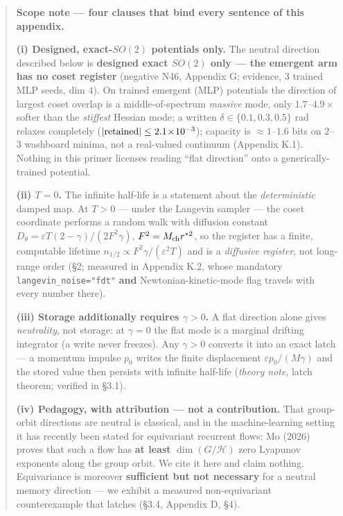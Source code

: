 \documentclass[10pt]{article}
\begin{document}
\begin{quote}\small
\textbf{Scope note --- four clauses that bind every sentence of this appendix.}

\textbf{(i) Designed, exact-$SO(2)$ potentials only.} The neutral direction described below is \textbf{designed exact $SO(2)$ only --- the emergent arm has no coset register} (negative N46, Appendix G; evidence, $3$ trained MLP seeds, dim $4$). On trained emergent (MLP) potentials the direction of largest coset overlap is a middle-of-spectrum \emph{massive} mode, only $1.7$--$4.9\times$ softer than the \emph{stiffest} Hessian mode; a written $\delta\in\{0.1,0.3,0.5\}$ rad relaxes completely ($|{\rm retained}|\le2.1\!\times\!10^{-3}$); capacity is $\approx1$--$1.6$ bits on $2$--$3$ washboard minima, not a real-valued continuum (Appendix K.1). Nothing in this primer licenses reading ``flat direction'' onto a generically-trained potential.

\textbf{(ii) $T=0$.} The infinite half-life is a statement about the \emph{deterministic} damped map. At $T>0$ --- under the Langevin sampler --- the coset coordinate performs a random walk with diffusion constant $D_\theta=\varepsilon T(2-\gamma)/(2F^2\gamma)$, $F^2=M_{\rm ch}r^{*2}$, so the register has a finite, computable lifetime $n_{1/2}\propto F^2\gamma/(\varepsilon^2T)$ and is a \emph{diffusive register}, not long-range order (\S2; measured in Appendix K.2, whose mandatory \texttt{langevin\_noise="fdt"} \textbf{and} Newtonian-kinetic-mode flag travels with every number there).

\textbf{(iii) Storage additionally requires $\gamma>0$.} A flat direction alone gives \emph{neutrality}, not storage: at $\gamma=0$ the flat mode is a marginal drifting integrator (a write never freezes). Any $\gamma>0$ converts it into an exact latch --- a momentum impulse $p_0$ writes the finite displacement $\varepsilon p_0/(M\gamma)$ and the stored value then persists with infinite half-life (\emph{theory note}, latch theorem; verified in \S3.1).

\textbf{(iv) Pedagogy, with attribution --- not a contribution.} That group-orbit directions are neutral is classical, and in the machine-learning setting it has recently been stated for equivariant recurrent flows: Mo (2026) proves that such a flow has \textbf{at least} $\dim(G/\mathcal H)$ zero Lyapunov exponents along the group orbit. We cite it here and claim nothing. Equivariance is moreover \textbf{sufficient but not necessary} for a neutral memory direction --- we exhibit a measured non-equivariant counterexample that latches (\S3.4, Appendix D, \S4).
\end{quote}
\end{document}
